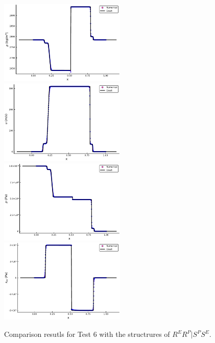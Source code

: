 \documentclass[review]{elsarticle}
\begin{document}
\begin{figure}
  \centering

  \includegraphics[width= 6cm] {case9rho.pdf}
  \includegraphics[width= 6cm] {case9u.pdf}
  \includegraphics[width= 6cm] {case9p.pdf}
  \includegraphics[width= 6cm] {case9sxx.pdf}

    \caption{Comparison resutls for Test 6 with the structrures of $R^ER^P|S^PS^E$.  }
  \label{fig:case9}
\end{figure}
\end{document}
